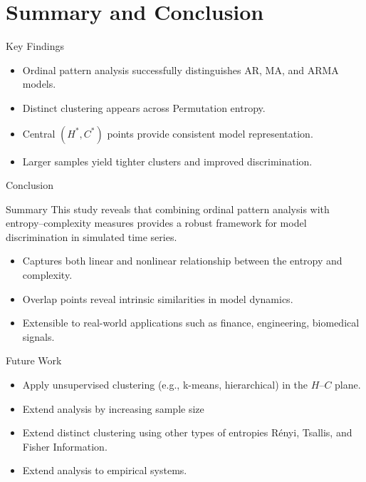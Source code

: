 \documentclass[11pt]{beamer}
\begin{document}
	
	\section{Summary and Conclusion}
	\begin{frame}{Key Findings}
		\begin{itemize}
			\item Ordinal pattern analysis successfully distinguishes AR, MA, and ARMA models.
			\item Distinct clustering appears across Permutation entropy.
			\item Central $(H^*, C^*)$ points provide consistent model representation.
			\item Larger samples yield tighter clusters and improved discrimination.
		\end{itemize}
	\end{frame}
	
	\begin{frame}{Conclusion}
		\begin{block}{Summary}
			This study reveals that combining ordinal pattern analysis with entropy–complexity measures provides a robust framework for model discrimination in simulated time series.
		\end{block}
		\begin{itemize}
			\item Captures both linear and nonlinear relationship between the entropy and complexity.
			\item Overlap points reveal intrinsic similarities in model dynamics.
			\item Extensible to real-world applications such as finance, engineering, biomedical signals.
		\end{itemize}
	\end{frame}
	
	\begin{frame}{Future Work}
		\begin{itemize}
			\item Apply unsupervised clustering (e.g., k-means, hierarchical) in the $H–C$ plane.
			\item Extend analysis by increasing sample size
			\item Extend distinct clustering using other types of entropies Rényi, Tsallis, and Fisher Information. 
			\item Extend analysis to empirical systems.
		\end{itemize}
	\end{frame}
	
\end{document}
